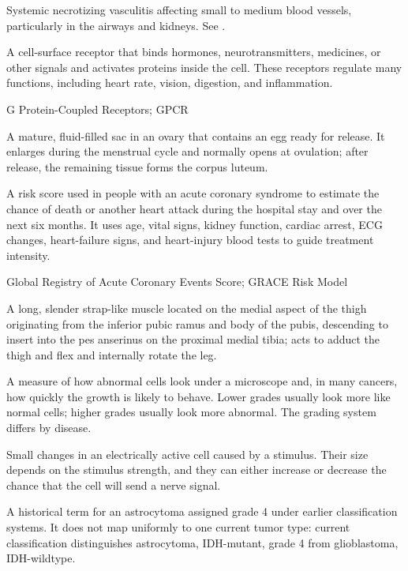  Systemic necrotizing vasculitis affecting small to medium blood vessels, particularly in the airways and kidneys. See .

 A cell-surface receptor that binds hormones, neurotransmitters, medicines, or other signals and activates proteins inside the cell. These receptors regulate many functions, including heart rate, vision, digestion, and inflammation.

\synonyms
G Protein-Coupled Receptors; GPCR

 A mature, fluid-filled sac in an ovary that contains an egg ready for release. It enlarges during the menstrual cycle and normally opens at ovulation; after release, the remaining tissue forms the corpus luteum.

 A risk score used in people with an acute coronary syndrome to estimate the chance of death or another heart attack during the hospital stay and over the next six months. It uses age, vital signs, kidney function, cardiac arrest, ECG changes, heart-failure signs, and heart-injury blood tests to guide treatment intensity.

\synonyms
Global Registry of Acute Coronary Events Score; GRACE Risk Model

 A long, slender strap-like muscle located on the medial aspect of the thigh originating from the inferior pubic ramus and body of the pubis, descending to insert into the pes anserinus on the proximal medial tibia; acts to adduct the thigh and flex and internally rotate the leg.

 A measure of how abnormal cells look under a microscope and, in many cancers, how quickly the growth is likely to behave. Lower grades usually look more like normal cells; higher grades usually look more abnormal. The grading system differs by disease.

 Small changes in an electrically active cell caused by a stimulus. Their size depends on the stimulus strength, and they can either increase or decrease the chance that the cell will send a nerve signal.

 A historical term for an astrocytoma assigned grade 4 under earlier classification systems. It does not map uniformly to one current tumor type: current classification distinguishes astrocytoma, IDH-mutant, grade 4 from glioblastoma, IDH-wildtype.

